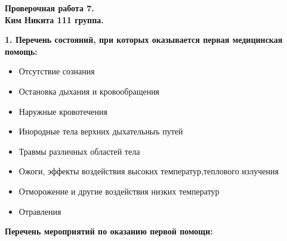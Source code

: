 \documentclass[a4paper, 12pt]{article}
\theoremstyle{definition}
\begin{document}
    \fontsize{14pt}{20pt}\selectfont
    \begin{center}
        \begin{Large}
            \textbf{Проверочная работа 7.}\\
            \textbf{Ким Никита 111 группа.} 
        \end{Large}
    \end{center}
    \textbf{1. Перечень состояний, при которых оказывается первая медицинская помощь:}
    \begin{itemize}
        \item Отсутствие сознания
        \item Остановка дыхания и кровообращения
        \item Наружные кровотечения 
        \item Инородные тела верхних дыхательныъ путей
        \item Травмы различных областей тела
        \item Ожоги, эффекты воздействия высоких температур,теплового излучения
        \item Отморожение и другие воздействия низких температур
        \item Отравления
    \end{itemize}
    \textbf{Перечень мероприятий по оказанию первой помощи:}
\end{document}
